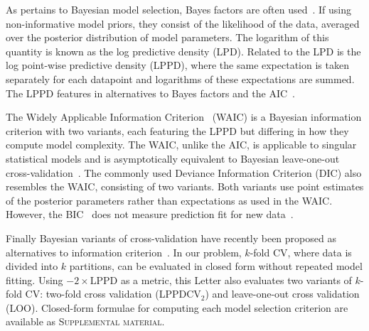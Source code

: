 \documentclass[prl,twocolumn,groupedaddress]{revtex4-1}
\begin{document}
As pertains to Bayesian model selection,  Bayes factors are often used~\cite{lavine1999bayes,posada2004model}. If using non-informative model priors, they consist of the likelihood of the data, averaged over the posterior distribution of model parameters. The logarithm of this quantity is known as the log predictive density (LPD). Related to the LPD is the log point-wise predictive density (LPPD), where the same expectation is taken separately for each datapoint and logarithms of these expectations are summed. The LPPD features in alternatives to Bayes factors and the AIC~\cite{gelman2014understanding}.

The Widely Applicable Information Criterion~\cite{watanabe2010asymptotic,watanabe2013widely} (WAIC) is a Bayesian information criterion with two variants, each featuring the LPPD but differing in how they compute model complexity.  The WAIC, unlike the AIC, is applicable to singular statistical models and is asymptotically equivalent to Bayesian leave-one-out cross-validation~\cite{watanabe2010asymptotic}. The commonly used Deviance Information Criterion (DIC) also resembles the WAIC,  consisting of two variants. Both variants use point estimates of the posterior parameters rather than expectations as used in the WAIC.
However, the BIC~\cite{narlikar2013one} does not measure prediction fit for new data~\cite{gelman2014understanding}.

Finally Bayesian variants of cross-validation have recently been proposed as alternatives to information criterion~\cite{gelman2014understanding}.  In our problem, $k$-fold CV, where data is divided into $k$ partitions, can be evaluated in closed form without repeated model fitting. Using $-2\times \textrm{LPPD}$ as a metric, this Letter also evaluates two variants of $k$-fold CV:
two-fold cross validation (LPPDCV$_2$) and leave-one-out cross validation (LOO).  Closed-form formulae for computing each model selection criterion are available as \textsc{Supplemental material}. 
\end{document}
